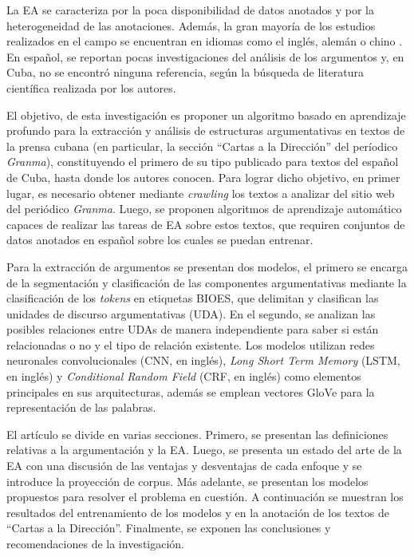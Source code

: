 \documentclass{rcci} %
\begin{document}
La EA se caracteriza por la poca disponibilidad de datos anotados y 
por la heterogeneidad de las 
anotaciones. Adem\'as, la gran mayor\'ia de los estudios realizados en el campo se encuentran en 
idiomas como el ingl\'es, alem\'an o chino \citep{eger2018cross}. 
En espa\~nol, se reportan pocas investigaciones del an\'alisis de los argumentos \citep{esteve2020mineria} y, en 
Cuba, no se encontr\'o ninguna referencia, seg\'un la b\'usqueda de literatura cient\'ifica
realizada por los autores.

El objetivo, de esta investigaci\'on es proponer un algoritmo basado en aprendizaje profundo 
para la extracci\'on y an\'alisis de estructuras argumentativas en textos 
de la prensa cubana (en particular, la secci\'on ``Cartas a la Direcci\'on'' del per\'iodico \textit{Granma}), 
constituyendo el primero de su tipo publicado para
textos del espa\~nol de Cuba, hasta donde los autores conocen. 
Para lograr dicho objetivo, en primer lugar, es necesario obtener mediante \textit{crawling} los textos a analizar del sitio 
web del peri\'odico \textit{Granma}. Luego, se proponen algoritmos de aprendizaje autom\'atico capaces de realizar las tareas 
de EA sobre estos textos, que requiren conjuntos 
de datos anotados en espa\~nol sobre los cuales se puedan entrenar.

Para la extracci\'on
de argumentos se presentan dos modelos, el primero se encarga de la segmentaci\'on y clasificaci\'on
de las componentes argumentativas mediante la clasificaci\'on de los \textit{tokens} en etiquetas BIOES, que %
delimitan y clasifican las unidades de discurso argumentativas (UDA). En el segundo, se analizan 
las posibles relaciones entre UDAs de manera independiente para saber si est\'an relacionadas o no y
el tipo de relaci\'on existente. Los modelos utilizan 
redes neuronales convolucionales (CNN, en ingl\'es), \textit{Long Short Term Memory} (LSTM, en ingl\'es) \citep{hochreiter1997long} y \textit{Conditional Random Field} (CRF, en ingl\'es) \citep{lafferty2001conditional}
como elementos principales en sus arquitecturas, adem\'as se emplean vectores GloVe \citep{pennington2014glove} para la representaci\'on
de las palabras. 

El art\'iculo se divide en varias secciones. Primero, se presentan las definiciones 
relativas a la argumentaci\'on y la EA. Luego, se presenta 
un estado del arte de la EA con una discusi\'on de las
ventajas y desventajas de cada enfoque y se introduce la proyecci\'on de corpus. M\'as adelante, 
se presentan los modelos propuestos para resolver el problema en 
cuesti\'on. A continuaci\'on se muestran los resultados del entrenamiento de los modelos y en 
la anotaci\'on de los textos de ``Cartas a la Direcci\'on''. Finalmente, se exponen las conclusiones y 
recomendaciones de la investigaci\'on.
\end{document}
